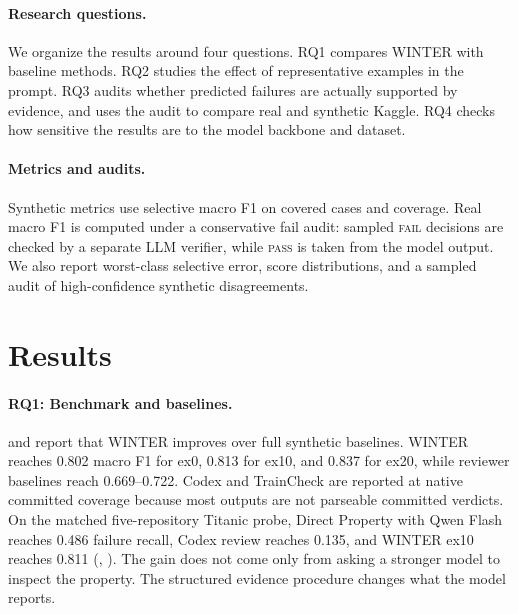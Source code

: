 \documentclass[11pt]{article}
\newcommand{\pass}{\textsc{pass}}
\newcommand{\fail}{\textsc{fail}}
\newcommand{\vibetest}{\textsc{WINTER}}
\begin{document}
\paragraph{Research questions.}
We organize the results around four questions.
RQ1 compares \vibetest{} with baseline methods.
RQ2 studies the effect of representative examples in the prompt.
RQ3 audits whether predicted failures are actually supported by evidence, and
uses the audit to compare real and synthetic Kaggle.
RQ4 checks how sensitive the results are to the model backbone and dataset.

\paragraph{Metrics and audits.}
Synthetic metrics use selective macro F1 on covered cases and coverage.
Real macro F1 is computed under a conservative fail audit: sampled \fail{}
decisions are checked by a separate LLM verifier, while \pass{} is taken from
the model output.
We also report worst-class selective error, score distributions, and a sampled
audit of high-confidence synthetic disagreements.

\section{Results}
\label{sec:results}

\paragraph{RQ1: Benchmark and baselines.}
 and  report that \vibetest{} improves
over full synthetic baselines.
\vibetest{} reaches 0.802 macro F1 for ex0, 0.813 for ex10, and 0.837 for
ex20, while reviewer baselines reach 0.669--0.722.
Codex and TrainCheck are reported at native committed coverage because most
outputs are not parseable committed verdicts.
On the matched five-repository Titanic probe, Direct Property with Qwen Flash
reaches 0.486 failure recall, Codex review reaches 0.135, and \vibetest{} ex10
reaches 0.811 (, ).
The gain does not come only from asking a stronger model to inspect the
property. The structured evidence procedure changes what the model reports.
\end{document}
